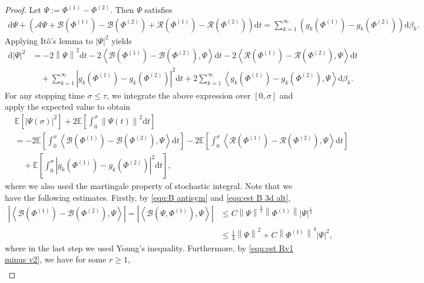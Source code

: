 \documentclass[11pt, reqno]{amsart}
\theoremstyle{definition}
\numberwithin{equation}{section}
\newcommand{\bb}{\mathbb}
\newcommand{\dt}{\mathrm{d}t}
\newcommand{\norm}[1]{\left\|{#1}\right\|}
\newcommand{\inpro}[2]{\left\langle#1,#2\right\rangle}
\newcommand{\abs}[1]{\left|{#1}\right|}
\begin{document}
\begin{proof}
Let $\Psi:= \Phi^{(1)}-\Phi^{(2)}$. Then $\Psi$ satisfies
\begin{align*}
	\mathrm{d}\Psi +\left(\mathcal{A} \Psi + \mathcal{B}(\Phi^{(1)})- \mathcal{B}(\Phi^{(2)}) + \mathcal{R}(\Phi^{(1)}) - \mathcal{R}(\Phi^{(2)}) \right) \dt = \sum_{k=1}^\infty \left(g_k(\Phi^{(1)})- g_k(\Phi^{(2)})\right) \mathrm{d}\beta_k.
\end{align*}
Applying It\^o's lemma to $\abs{\Psi}^2$ yields
\begin{align*}
	\mathrm{d}\abs{\Psi}^2
	&=
	-2 \norm{\Psi}^2 \dt
	-2 \inpro{\mathcal{B}(\Phi^{(1)})- \mathcal{B}(\Phi^{(2)})}{\Psi} \dt
	-2 \inpro{\mathcal{R}(\Phi^{(1)}) - \mathcal{R}(\Phi^{(2)})}{\Psi} \dt 
	\\
	&\quad
	+
	\sum_{k=1}^\infty \abs{g_k(\Phi^{(1)})- g_k(\Phi^{(2)})}^2 \dt 
	+
	2\sum_{k=1}^\infty \inpro{g_k(\Phi^{(1)})-g_k(\Phi^{(2)})}{\Psi} \mathrm{d}\beta_k.
\end{align*}
For any stopping time $\sigma\leq\tau$, we integrate the above expression over $[0,\sigma]$ and apply the expected value to obtain
\begin{align}\label{equ:e Psi sigma}
	&\bb{E} \left[\abs{\Psi(\sigma)}^2\right] + 2\bb{E} \left[\int_0^\sigma \norm{\Psi(t)}^2 \dt\right] 
	\nonumber\\
	&=
	-2 \bb{E}\left[\int_0^\sigma \inpro{\mathcal{B}(\Phi^{(1)})- \mathcal{B}(\Phi^{(2)})}{\Psi} \dt \right] 
	-
	2 \bb{E}\left[\int_0^\sigma \inpro{\mathcal{R}(\Phi^{(1)})- \mathcal{R}(\Phi^{(2)})}{\Psi} \dt \right] 
	\nonumber\\
	&\quad
	+
	\bb{E} \left[ \int_0^\sigma \abs{g_k(\Phi^{(1)})- g_k(\Phi^{(2)})}^2 \dt \right],
\end{align}
where we also used the martingale property of stochastic integral. Note that we have the following estimates. Firstly, by \eqref{equ:B antisym} and \eqref{equ:est B 3d alt},
\begin{align}\label{equ:B1 min B2}
	\abs{\inpro{\mathcal{B}(\Phi^{(1)})- \mathcal{B}(\Phi^{(2)})}{\Psi}}
	=
	\abs{\inpro{\mathcal{B}(\Psi,\Phi^{(1)})}{\Psi}}
	&\leq
	C\norm{\Psi}^{\frac32} \norm{\Phi^{(1)}} \abs{\Psi}^{\frac12}
	\nonumber\\
	&\leq
	\frac14 \norm{\Psi}^2 + C \norm{\Phi^{(1)}}^4 \abs{\Psi}^2,
\end{align}
where in the last step we used Young's inequality. Furthermore, by \eqref{equ:est Rv1 minus v2}, we have for some $r\geq 1$,
\begin{align}\label{equ:R1 min R2}

\end{align}
\end{proof}
\end{document}
